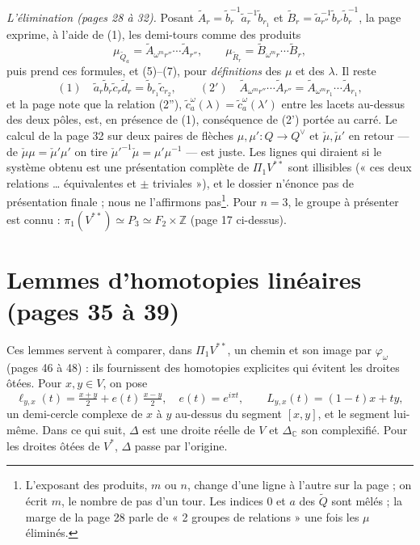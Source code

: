 \documentclass[11pt,a4paper]{article}
\begin{document}
\emph{L'élimination (pages 28 à 32).} Posant $\widetilde{A}_r = \tilde
b_r^{-1} \tilde a_r^{-1} \tilde b_{r_1}$ et $\widetilde{B}_r = \tilde
a_{r''}^{-1} \tilde b_{r'} \tilde b_r^{-1}$, la page exprime, à l'aide de (1),
les demi-tours comme des produits
\[
\mu_{\widetilde{Q}_a} = \widetilde{A}_{\omega^{m} r''} \cdots
\widetilde{A}_{r''}, \qquad \mu_{\widetilde{R}_r} = \widetilde{B}_{\omega^{m} r}
\cdots \widetilde{B}_r,
\]
puis prend ces formules, et (5)--(7), pour \emph{définitions} des $\mu$ et des
$\lambda$. Il reste
\[
(1)\quad \tilde a_r \tilde b_r \tilde c_r \tilde d_r = \tilde b_{r_1} \tilde
c_{r_2}, \qquad (2')\quad \widetilde{A}_{\omega^{m} r''} \cdots
\widetilde{A}_{r''} = \widetilde{A}_{\omega^{m} r_1} \cdots \widetilde{A}_{r_1},
\]
et la page note que la relation (2''), $\tilde c^\omega_a(\lambda) = \tilde
c^\omega_a(\lambda')$ entre les lacets au-dessus des deux pôles, est, en
présence de (1), conséquence de (2') portée au carré. Le calcul de la page 32
sur deux paires de flèches $\mu, \mu' : Q \to Q^{\vee}$ et $\check\mu,
\check\mu'$ en retour — de $\check\mu\mu = \check\mu'\mu'$ on tire
$\check\mu'^{-1}\check\mu = \mu'\mu^{-1}$ — est juste. Les lignes qui
diraient si le système obtenu est une présentation complète de $\Pi_1
V^{**}$ sont illisibles (« ces deux relations \ldots{} équivalentes et $\pm$
triviales »), et le dossier n'énonce pas de présentation finale ; nous ne
l'affirmons pas\footnote{L'exposant des produits, $m$ ou $n$, change d'une
ligne à l'autre sur la page ; on écrit $m$, le nombre de pas d'un tour.
Les indices $0$ et $a$ des $\widetilde{Q}$ sont mêlés ; la marge de la page
28 parle de « 2 groupes de relations » une fois les $\mu$ éliminés.}. Pour
$n = 3$, le groupe à présenter est connu : $\pi_1(V^{**}) \simeq P_3 \simeq
F_2 \times \mathbb{Z}$ (page 17 ci-dessus).

\section*{Lemmes d'homotopies linéaires (pages 35 à 39)}

Ces lemmes servent à comparer, dans $\Pi_1 V^{**}$, un chemin et son image
par $\varphi_\omega$ (pages 46 à 48) : ils fournissent des homotopies
explicites qui évitent les droites ôtées. Pour $x, y \in V$, on pose
\[
\ell_{y,x}(t) = \tfrac{x+y}{2} + e(t)\,\tfrac{x-y}{2}, \quad e(t) = e^{i\pi
t}, \qquad L_{y,x}(t) = (1-t)x + t y,
\]
un demi-cercle complexe de $x$ à $y$ au-dessus du segment $[x,y]$, et le
segment lui-même. Dans ce qui suit, $\Delta$ est une droite réelle de $V$ et
$\Delta_{\mathbb{C}}$ son complexifié. Pour les droites ôtées de $V^{*}$,
$\Delta$ passe par l'origine.
\end{document}
